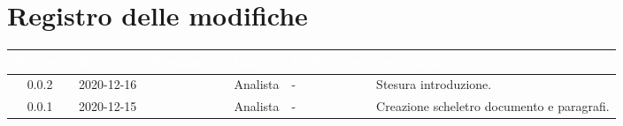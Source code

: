 \section*{Registro delle modifiche}
{
\renewcommand{\arraystretch}{1.5}
\centering
\begin{longtable}{c C{2.6cm} C{2.6cm} C{2.6cm} C{2.6cm} C{3.5cm}}
\textcolor{white}{\textbf{Versione}}&
\textcolor{white}{\textbf{Data}}&
\textcolor{white}{\textbf{Nominativo}}&
\textcolor{white}{\textbf{Ruolo}}&
\textcolor{white}{\textbf{Verificatore}}&
\textcolor{white}{\textbf{Descrizione}}\\	
\endhead
		
0.0.2 & 2020-12-16 & \SP{} & Analista & - & Stesura introduzione. \\
0.0.1 & 2020-12-15 & \SP{} & Analista & - & Creazione scheletro documento e paragrafi. \\
		
\end{longtable}
}
